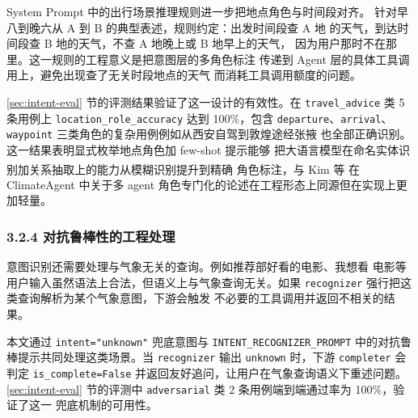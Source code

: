 \documentclass[a4paper]{article}
\theoremstyle{definition}
\theoremstyle{plain}
\theoremstyle{remark}
\newcommand{\reffig}[1]{图 \ref{#1}}
\newcommand{\reftab}[1]{表 \ref{#1}}
\let\oldcite\cite
\renewcommand{\cite}[1]{\textsuperscript{\oldcite{#1}}}
\newcommand{\bk}{\discretionary{}{}{}}
\begin{document}
System Prompt 中的出行场景推理规则进一步把地点角色与时间段对齐。
针对早八到晚六从 A 到 B 的典型表述，规则约定：出发时间段查 A 地
的天气，到达时间段查 B 地的天气，不查 A 地晚上或 B 地早上的天气，
因为用户那时不在那里。这一规则的工程意义是把意图层的多角色标注
传递到 Agent 层的具体工具调用上，避免出现查了无关时段地点的天气
而消耗工具调用额度的问题。

\ref{sec:intent-eval} 节的评测结果验证了这一设计的有效性。在
\texttt{travel\_\bk{}advice} 类 5 条用例上 \texttt{location\_\bk{}role\_\bk{}accuracy}
达到 100\%，包含 \texttt{departure}、\texttt{arrival}、
\texttt{waypoint} 三类角色的复杂用例例如从西安自驾到敦煌途经张掖
也全部正确识别。这一结果表明显式枚举地点角色加 few-shot 提示能够
把大语言模型在命名实体识别加关系抽取上的能力从模糊识别提升到精确
角色标注，与 Kim 等 \cite{ref1} 在 ClimateAgent 中关于多 agent
角色专门化的论述在工程形态上同源但在实现上更加轻量。

\subsubsection*{3.2.4 \quad 对抗鲁棒性的工程处理}

意图识别还需要处理与气象无关的查询。例如推荐部好看的电影、我想看
电影等用户输入虽然语法上合法，但语义上与气象查询无关。如果
\texttt{recognizer} 强行把这类查询解析为某个气象意图，下游会触发
不必要的工具调用并返回不相关的结果。

本文通过 \texttt{intent=\bk{}"unknown"} 兜底意图与 \texttt{INTENT\_\bk{}RECOGNIZER\_\bk{}PROMPT}
中的对抗鲁棒提示共同处理这类场景。当 \texttt{recognizer} 输出
\texttt{unknown} 时，下游 \texttt{completer} 会判定 \texttt{is\_\bk{}complete=\bk{}False}
并返回友好追问，让用户在气象查询语义下重述问题。
\ref{sec:intent-eval} 节的评测中
\texttt{adversarial} 类 2 条用例端到端通过率为 100\%，验证了这一
兜底机制的可用性。



﻿%
\end{document}
